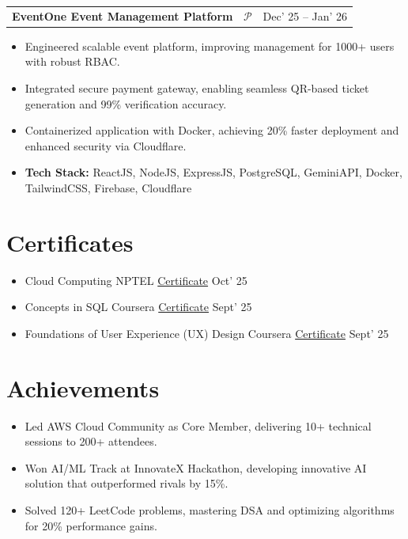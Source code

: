 \documentclass[10pt, a4paper]{article}
\makeatletter
\newcommand{\entryrow}[2]{%
  \noindent\begin{tabularx}{\linewidth}{@{}X@{\hspace{4pt}}r@{}}
    {\color{headingblue}\bfseries\fontsize{8.5pt}{10pt}\selectfont #1} &
    {\fontsize{8.5pt}{10pt}\selectfont #2}
  \end{tabularx}\par\vspace{1pt}%
}
\makeatother
\begin{document}
\vspace{5pt}
\entryrow{EventOne \textbar{} Event Management Platform \textbar{}~\href{https://github.com/G4uravXDev}{\textcolor{linknavy}{\ensuremath{\mathcal{P}}}}}{Dec' 25 -- Jan' 26}
\begin{itemize}
  \item Engineered scalable event platform, improving management for 1000+ users with robust RBAC.
  \item Integrated secure payment gateway, enabling seamless QR-based ticket generation and 99\% verification accuracy.
  \item Containerized application with Docker, achieving 20\% faster deployment and enhanced security via Cloudflare.
  \item \textbf{Tech Stack:} ReactJS, NodeJS, ExpressJS, PostgreSQL, GeminiAPI, Docker, TailwindCSS, Firebase, Cloudflare
\end{itemize}

\section{Certificates}

\begin{itemize}[itemsep=5pt]
  \item Cloud Computing \textbar{} NPTEL \textbar{} \href{https://example.com/certificate}{\textcolor{linknavy}{Certificate}}
        \hfill {\fontsize{8.5pt}{10pt}\selectfont Oct' 25}
  \item Concepts in SQL \textbar{} Coursera \textbar{} \href{https://example.com/certificate}{\textcolor{linknavy}{Certificate}}
        \hfill {\fontsize{8.5pt}{10pt}\selectfont Sept' 25}
  \item Foundations of User Experience (UX) Design \textbar{} Coursera \textbar{} \href{https://example.com/certificate}{\textcolor{linknavy}{Certificate}}
        \hfill {\fontsize{8.5pt}{10pt}\selectfont Sept' 25}
\end{itemize}

\section{Achievements}

\begin{itemize}
  \item Led AWS Cloud Community as Core Member, delivering 10+ technical sessions to 200+ attendees.
  \item Won AI/ML Track at InnovateX Hackathon, developing innovative AI solution that outperformed rivals by 15\%.
  \item Solved 120+ LeetCode problems, mastering DSA and optimizing algorithms for 20\% performance gains.
\end{itemize}
\end{document}
